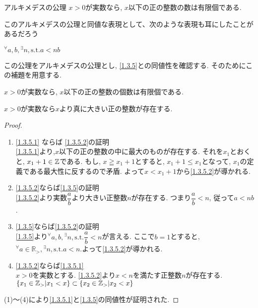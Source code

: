 \begin{axm}\label{1.3.5}
アルキメデスの公理 \quad $x>0$が実数なら, $x$以下の正の整数の数は有限個である. 
\end{axm}

このアルキメデスの公理と同値な表現として、次のような表現も耳にしたことがあるだろう
\begin{axm}\label{1.3.5.1}
\({}^\forall a, b , {}^\exists n, \mathrm{s.t.} a<nb\)
\end{axm}
この公理をアルキメデスの公理とし, \cref{1.3.5}との同値性を確認する. そのためにこの補題を用意する. 

\begin{lem}\label{1.3.5.2}
$x>0$が実数なら, $x$以下の正の整数の個数は有限個である.
\end{lem}


\begin{prop}
$x>0$が実数なら$x$より真に大きい正の整数が存在する.
\end{prop}

\begin{proof}
\begin{enumerate}
\renewcommand{\labelenumi}{(\arabic{enumi})}

\item \cref{1.3.5.1} ならば \cref{1.3.5.2}の証明
\\ \cref{1.3.5.1}より,$x$以下の正の整数の中に最大のものが存在する. それを$x_1$とおくと, $x_1+1\in \mathbb{Z}$である. もし, $x\geqq x_1+1$とすると, $x_1+1\leq x_1$となって, $x_1$の定義である最大性に反するので矛盾. よって$x<x_1+1$から\cref{1.3.5.2}が導かれる.
\item \cref{1.3.5.2}ならば\cref{1.3.5}の証明
\\ \cref{1.3.5.2}より実数$\dfrac{a}{b}$より大きい正整数$n$が存在する. つまり$\dfrac{a}{b}<n$, 従って$a<nb$.
\item \cref{1.3.5}ならば\cref{1.3.5.2}の証明
\\ \cref{1.3.5}より\({}^\forall a, b , {}^\exists n, \mathrm{s.t.}　\dfrac{a}{b}<n\)が言える. ここで$b=1$とすると, \({}^\forall a\in\mathbb{R_>},  {}^\exists n, \mathrm{s.t.} a<n\).よって\cref{1.3.5.2}が導かれる. 
\item \cref{1.3.5.2}ならば\cref{1.3.5.1}
\\$x>0$を実数とする. \cref{1.3.5.2}より$x<n$を満たす正整数$n$が存在する. $\{x_1\in\mathbb{Z}_>|x_1<x\}\subset\{x_2\in\mathbb{Z}_>|x_2<x\}$
\end{enumerate}
(1)～(4)により\cref{1.3.5.1}と\cref{1.3.5}の同値性が証明された.
\end{proof}

